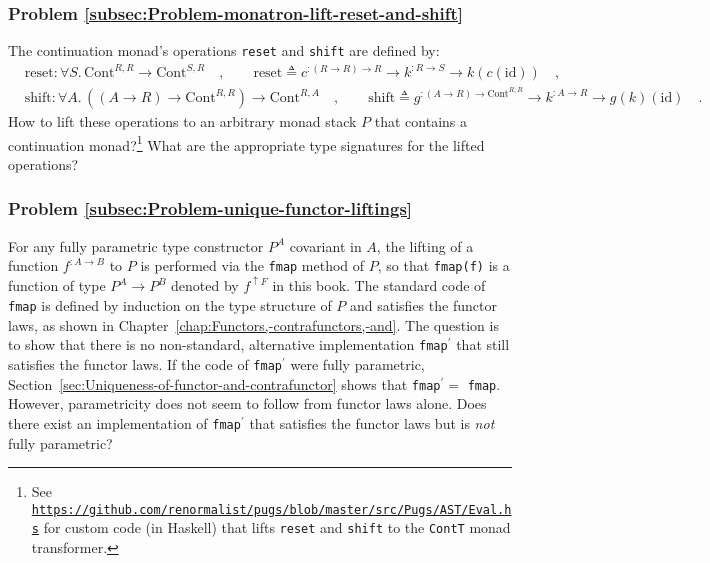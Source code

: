 \subsubsection{Problem \label{subsec:Problem-monatron-lift-reset-and-shift}\ref{subsec:Problem-monatron-lift-reset-and-shift}}

The continuation monad\textsf{'}s operations \lstinline!reset! and \lstinline!shift!
are defined by:
\begin{align*}
 & \text{reset}:\forall S.\,\text{Cont}^{R,R}\rightarrow\text{Cont}^{S,R}\quad,\quad\quad\text{reset}\triangleq c^{:\left(R\rightarrow R\right)\rightarrow R}\rightarrow k^{:R\rightarrow S}\rightarrow k(c(\text{id}))\quad,\\
 & \text{shift}:\forall A.\,((A\rightarrow R)\rightarrow\text{Cont}^{R,R})\rightarrow\text{Cont}^{R,A}\quad,\quad\quad\text{shift}\triangleq g^{:\left(A\rightarrow R\right)\rightarrow\text{Cont}^{R,R}}\rightarrow k^{:A\rightarrow R}\rightarrow g(k)(\text{id})\quad.
\end{align*}
How to lift these operations to an arbitrary monad stack $P$ that
contains a continuation monad?\footnote{See \texttt{\href{https://github.com/renormalist/pugs/blob/master/src/Pugs/AST/Eval.hs}{https://github.com/renormalist/pugs/blob/master/src/Pugs/AST/Eval.hs}}
for custom code (in Haskell) that lifts \lstinline!reset! and \lstinline!shift!
to the \lstinline!ContT! monad transformer.} What are the appropriate type signatures for the lifted operations?

\subsubsection{Problem \label{subsec:Problem-unique-functor-liftings}\ref{subsec:Problem-unique-functor-liftings}}

For any fully parametric type constructor $P^{A}$ covariant in $A$,
the lifting of a function $f^{:A\rightarrow B}$ to $P$ is performed
via the \lstinline!fmap! method of $P$, so that \lstinline!fmap(f)!
is a function of type $P^{A}\rightarrow P^{B}$ denoted by $f^{\uparrow F}$
in this book. The standard code of \lstinline!fmap! is defined by
induction on the type structure of $P$ and satisfies the functor
laws, as shown in Chapter~\ref{chap:Functors,-contrafunctors,-and}.
The question is to show that there is no non-standard, alternative
implementation \lstinline!fmap!$^{\prime}$ that still satisfies
the functor laws. If the code of \lstinline!fmap!$^{\prime}$ were
fully parametric, Section~\ref{sec:Uniqueness-of-functor-and-contrafunctor}
shows that \lstinline!fmap!$^{\prime}=$ \lstinline!fmap!. However,
parametricity does not seem to follow from functor laws alone. Does
there exist an implementation of \lstinline!fmap!$^{\prime}$ that
satisfies the functor laws but is \emph{not} fully parametric?
